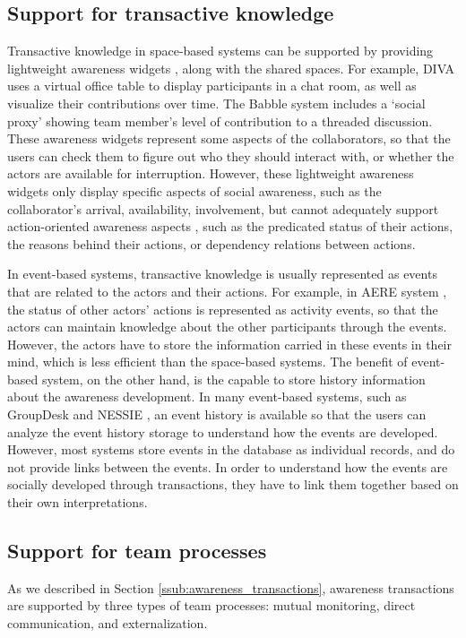\subsection{Support for transactive knowledge} %
\label{sub:support_for_transactive_knowledge}
Transactive knowledge in space-based systems can be supported by providing lightweight awareness widgets \cite{Gutwin1996}, along with the shared spaces. For example, DIVA uses a virtual office table to display participants in a chat room, as well as visualize their contributions over time\cite{Berlage1999}. The Babble system \cite{Erickson1999} includes a `social proxy' showing team member's level of contribution to a threaded discussion. These awareness widgets represent some aspects of the collaborators, so that the users can check them to figure out who they should interact with, or whether the actors are available for interruption. However, these lightweight awareness widgets only display specific aspects of social awareness, such as the collaborator's arrival, availability, involvement, but cannot adequately support action-oriented awareness aspects \cite{carroll2003a}, such as the predicated status of their actions, the reasons behind their actions, or dependency relations between actions.

In event-based systems, transactive knowledge is usually represented as events that are related to the actors and their actions. For example, in AERE system \cite{fuchs1999a}, the status of other actors' actions is represented as activity events, so that the actors can maintain knowledge about the other participants through the events. However, the actors have to store the information carried in these events in their mind, which is less efficient than the space-based systems. The benefit of event-based system, on the other hand, is the capable to store history information about the awareness development. In many event-based systems, such as GroupDesk \cite{Fuchs1995} and NESSIE \cite{prinz1999a}, an event history is available so that the users can analyze the event history storage to understand how the events are developed. However, most systems store events in the database as individual records, and do not provide links between the events. In order to understand how the events are socially developed through transactions, they have to link them together based on their own interpretations. 

\subsection{Support for team processes} %
\label{sub:support_for_team_processes}
As we described in Section \ref{ssub:awareness_transactions}, awareness transactions are supported by three types of team processes: mutual monitoring, direct communication, and externalization.

